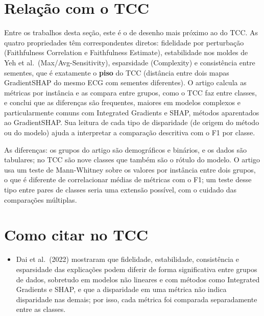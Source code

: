 \documentclass[11pt,a4paper]{article}
\begin{document}
\section{Relação com o TCC}
Entre os trabalhos desta seção, este é o de desenho mais próximo ao do TCC. As quatro propriedades têm correspondentes diretos: fidelidade por perturbação (Faithfulness Correlation e Faithfulness Estimate), estabilidade nos moldes de Yeh et al.\ (Max/Avg-Sensitivity), esparsidade (Complexity) e consistência entre sementes, que é exatamente o \textbf{piso} do TCC (distância entre dois mapas GradientSHAP do mesmo ECG com sementes diferentes). O artigo calcula as métricas por instância e as compara entre grupos, como o TCC faz entre classes, e conclui que as diferenças são frequentes, maiores em modelos complexos e particularmente comuns com Integrated Gradients e SHAP, métodos aparentados ao GradientSHAP. Sua leitura de cada tipo de disparidade (de origem do método ou do modelo) ajuda a interpretar a comparação descritiva com o F1 por classe.

As diferenças: os grupos do artigo são demográficos e binários, e os dados são tabulares; no TCC são nove classes que também são o rótulo do modelo. O artigo usa um teste de Mann-Whitney sobre os valores por instância entre dois grupos, o que é diferente de correlacionar médias de métricas com o F1; um teste desse tipo entre pares de classes seria uma extensão possível, com o cuidado das comparações múltiplas.

\section{Como citar no TCC}
\begin{itemize}
  \item Dai et al.\ (2022) mostraram que fidelidade, estabilidade, consistência e esparsidade das explicações podem diferir de forma significativa entre grupos de dados, sobretudo em modelos não lineares e com métodos como Integrated Gradients e SHAP, e que a disparidade em uma métrica não indica disparidade nas demais; por isso, cada métrica foi comparada separadamente entre as classes.
\end{itemize}
\end{document}
